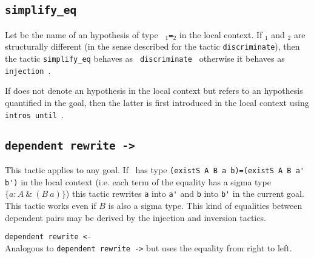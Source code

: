 \subsection{\tt simplify\_eq {\ident}}
\label{simplify-eq}
Let {\ident} be the name of an hypothesis of type {\tt
  {\term$_1$}={\term$_2$}} in the local context. If {\term$_1$} and
{\term$_2$} are structurally different (in the sense described for the
tactic {\tt discriminate}), then the tactic {\tt simplify\_eq} behaves as {\tt
  discriminate {\ident}} otherwise it behaves as {\tt injection
  {\ident}}.

\Rem If {\ident} does not denote an hypothesis in the local context
but refers to an hypothesis quantified in the goal, then the
latter is first introduced in the local context using
\texttt{intros until \ident}.


\subsection{\tt dependent rewrite -> {\ident}}
\label{dependent-rewrite}
This tactic applies to any goal.  If \ident\ has type 
\verb+(existS A B a b)=(existS A B a' b')+ 
in the local context (i.e. each term of the
equality has a sigma type $\{ a:A~ \&~(B~a)\}$) this tactic rewrites
\verb+a+ into \verb+a'+ and \verb+b+ into \verb+b'+ in the current
goal. This tactic works even if $B$ is also a sigma type.  This kind
of equalities between dependent pairs may be derived by the injection
and inversion tactics.

\begin{Variants}
\item{\tt dependent rewrite <- {\ident}}
 \\
Analogous to {\tt dependent rewrite ->} but uses the equality from
right to left.
\end{Variants}

